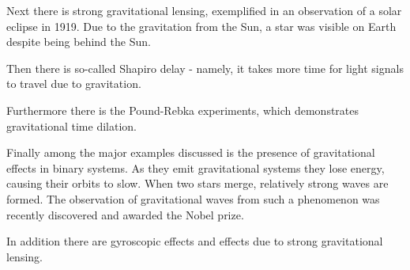 Next there is strong gravitational lensing, exemplified in an observation of a solar eclipse in 1919. Due to the gravitation from the Sun, a star was visible on Earth despite being behind the Sun.

Then there is so-called Shapiro delay - namely, it takes more time for light signals to travel due to gravitation.

Furthermore there is the Pound-Rebka experiments, which demonstrates gravitational time dilation.

Finally among the major examples discussed is the presence of gravitational effects in binary systems. As they emit gravitational systems they lose energy, causing their orbits to slow. When two stars merge, relatively strong waves are formed. The observation of gravitational waves from such a phenomenon was recently discovered and awarded the Nobel prize.

In addition there are gyroscopic effects and effects due to strong gravitational lensing.